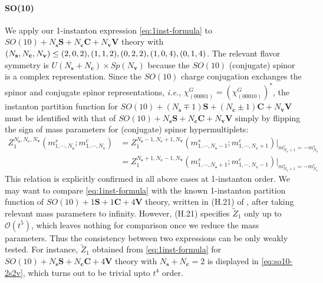 \documentclass[letterpaper, 11pt]{article}
\newcommand{\nn}{\nonumber}
\begin{document}
{\paragraph{SO(10)}
We apply our 1-instanton expression \eqref{eq:1inst-formula} to $SO(10) + N_{\mathbf s}\mathbf{S} + N_{\mathbf c}\mathbf{C} + N_{\mathbf v}\mathbf{V}$ theory with $( N_{\bf s},  N_{\bf c}, N_{\bf v}) \leq (2,0,2),(1,1,2), (0,2,2),(1,0,4),(0,1,4)$. The relevant flavor symmetry is $U(N_\mathbf{s} + N_\mathbf{c}) \times Sp(N_\mathbf{v})$ because  the $SO(10)$ (conjugate) spinor is a complex representation. Since the $SO(10)$ charge conjugation exchanges the spinor and conjugate spinor representations, 
\textit{i.e.}, $\chi_{(00001)}^G = (\chi_{(00010)}^G)^*$, the instanton partition function for $SO(10) + (N_{\mathbf s}\mp 1)\mathbf{S} + (N_{\mathbf c}\pm 1)\mathbf{C} + N_{\mathbf v}\mathbf{V}$  must be identified with that of $SO(10) + N_{\mathbf s}\mathbf{S} + N_{\mathbf c}\mathbf{C} + N_{\mathbf v}\mathbf{V}$ simply by flipping the sign of mass parameters for (conjugate) spinor hypermultiplets: 
\begin{align}
Z_{1}^{N_{\mathbf{s}},N_\mathbf{c},N_{\mathbf{v}}}(m^s_{1, \cdots, N_\mathbf{s}}; m^c_{1,\cdots,N_\mathbf{c}}) &= Z_{1}^{N_{\mathbf{s}}-1,N_\mathbf{c}+1,N_{\mathbf{v}}}(m^s_{1, \cdots, N_\mathbf{s}-1}; m^c_{1,\cdots,N_\mathbf{c}+1})\big|_{m^c_{N_\mathbf{c}+1} = -m^s_{N_\mathbf{s}}}\nn\\ 
  &= Z_{1}^{N_{\mathbf{s}}+1,N_\mathbf{c}-1,N_{\mathbf{v}}}(m^s_{1, \cdots, N_\mathbf{s}+1}; m^c_{1,\cdots,N_\mathbf{c}-1})\big|_{m^s_{N_\mathbf{s}+1} = -m^c_{N_\mathbf{c}}}
\end{align}
This relation is explicitly confirmed in all above cases at 1-instanton order. 
We may want to compare \eqref{eq:1inst-formula} with the known 1-instanton partition function of $SO(10) + 1\mathbf{S} + 1\mathbf{C} + 4\mathbf{V}$ theory, written in (H.21) of \cite{DelZotto:2018tcj}, after taking relevant mass parameters  to infinity. However, (H.21) specifies $\tilde{Z}_1$ only up to $\mathcal{O}(t^5)$, which leaves nothing for comparison once we reduce the mass parameters. Thus the consistency between two expressions can be only weakly tested. For instance, $\tilde{Z}_{1}$ obtained from \eqref{eq:1inst-formula} for $SO(10) + N_\mathbf{s}\mathbf{S}+ N_\mathbf{c}\mathbf{C} + 4\mathbf{V}$ theory with $ N_\mathbf{s} 
+ N_\mathbf{c} = 2$ is displayed in \eqref{eq:so10-2s2v}, which turns out to be trivial upto $t^4$ order.



}
\end{document}
